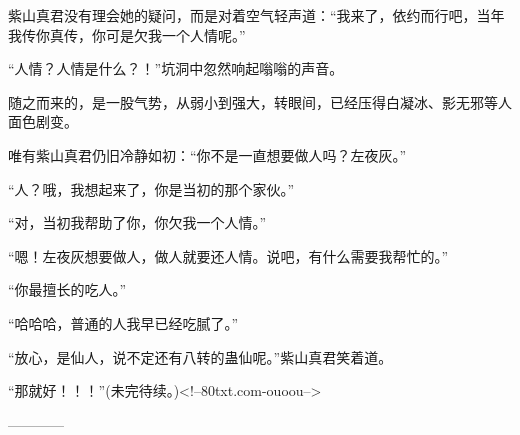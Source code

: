 \begin{this_body}
紫山真君没有理会她的疑问，而是对着空气轻声道：“我来了，依约而行吧，当年我传你真传，你可是欠我一个人情呢。”

“人情？人情是什么？！”坑洞中忽然响起嗡嗡的声音。

随之而来的，是一股气势，从弱小到强大，转眼间，已经压得白凝冰、影无邪等人面色剧变。

唯有紫山真君仍旧冷静如初：“你不是一直想要做人吗？左夜灰。”

“人？哦，我想起来了，你是当初的那个家伙。”

“对，当初我帮助了你，你欠我一个人情。”

“嗯！左夜灰想要做人，做人就要还人情。说吧，有什么需要我帮忙的。”

“你最擅长的吃人。”

“哈哈哈，普通的人我早已经吃腻了。”

“放心，是仙人，说不定还有八转的蛊仙呢。”紫山真君笑着道。

“那就好！！！”(未完待续。)<!--80txt.com-ouoou-->

------------

\end{this_body}

